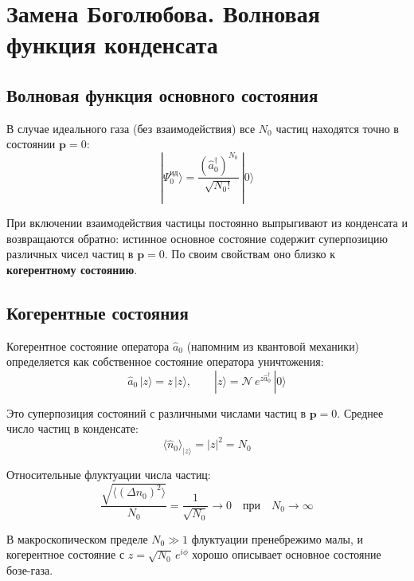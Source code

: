 \documentclass[../general/general]{subfiles}
\begin{document}


\section{Замена Боголюбова. Волновая функция конденсата}

\subsection{Волновая функция основного состояния}

В случае идеального газа (без взаимодействия) все $N_0$ частиц находятся точно в состоянии $\mathbf{p}=0$:
\begin{equation}
    |\Psi_0^{\text{ид}}\rangle = \frac{(\hat{a}^\dagger_0)^{N_0}}{\sqrt{N_0!}}\,|0\rangle
\end{equation}

При включении взаимодействия частицы постоянно выпрыгивают из конденсата и возвращаются обратно: истинное основное состояние содержит суперпозицию различных чисел частиц в $\mathbf{p}=0$. По своим свойствам оно близко к \textbf{когерентному состоянию}.

\subsection{Когерентные состояния}

Когерентное состояние оператора $\hat{a}_0$ (напомним из квантовой механики) определяется как собственное состояние оператора уничтожения:
\begin{equation}
    \hat{a}_0\,|z\rangle = z\,|z\rangle, \qquad |z\rangle = \mathcal{N}\,e^{z\hat{a}^\dagger_0}\,|0\rangle
\end{equation}

Это суперпозиция состояний с различными числами частиц в $\mathbf{p}=0$. Среднее число частиц в конденсате:
\begin{equation}
    \langle\hat{n}_0\rangle_{|z\rangle} = |z|^2 = N_0
\end{equation}

Относительные флуктуации числа частиц:
\begin{equation}
    \frac{\sqrt{\langle(\Delta n_0)^2\rangle}}{N_0} = \frac{1}{\sqrt{N_0}} \to 0 \quad \text{при} \quad N_0 \to \infty
\end{equation}

В макроскопическом пределе $N_0 \gg 1$ флуктуации пренебрежимо малы, и когерентное состояние с $z = \sqrt{N_0}\,e^{i\phi}$ хорошо описывает основное состояние бозе-газа.
\end{document}
